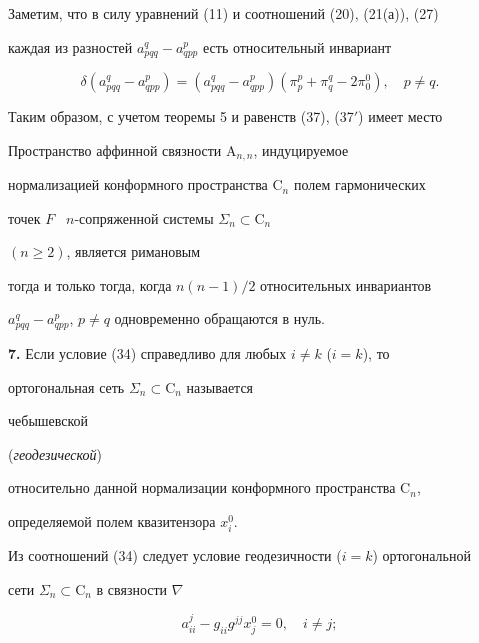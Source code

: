  


Заметим, что в силу уравнений (11) и соотношений (20), (21(а)), (27) 


каждая из разностей $a^q_{pqq}-a^p_{qpp}$ есть относительный инвариант 


$$ 


\delta(a^q_{pqq}-a^p_{qpp})=(a^q_{pqq}-a^p_{qpp}) 


(\pi^p_p+\pi^q_q-2\pi_0^0),\quad p\ne q. 


$$ 


 


Таким образом, с учетом теоремы 5 и равенств (37), (37${'}$) имеет место 


 


\begin{thm} 


Пространство аффинной связности $\mathrm A_{n,n}$, индуцируемое 


нормализацией конформного пространства $\mathrm C_n$ полем гармонических 


точек $F$ \ $n$-сопряженной системы $\Sigma_n\subset\mathrm C_n$ 


$(n\ge2)$, является римановым 


тогда и только тогда, когда ${n(n-1)}/{2}$ относительных инвариантов 


$a^q_{pqq}-a^p_{qpp}$, $p\ne q$ одновременно обращаются в нуль. 


\end{thm} 


 


 


{\bf 7.} Если условие (34) справедливо для любых $i{\ne} k$ ($i{=}k$), то 


ортогональная сеть $\Sigma_n\subset\mathrm C_n$ называется {\it 


чебышевской} ({\it геодезической}) 


относительно данной нормализации конформного пространства $\mathrm C_n$, 


определяемой полем квазитензора $x^0_i$. 


 


Из соотношений (34) следует условие геодезичности ($i=k$) ортогональной 


сети $\Sigma_n\subset\mathrm C_n$ в связности $\nabla$ 


\begin{equation} 


a^j_{ii}-g_{ii}g^{jj}x^0_j=0,\quad i\ne j; 


\end{equation} 


